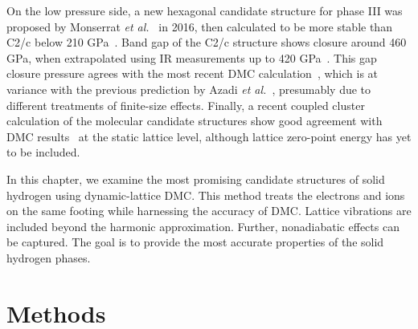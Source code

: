 On the low pressure side, a new hexagonal candidate structure for phase III was proposed by Monserrat \textit{et al.}~\cite{Monserrat2016} in 2016, then calculated to be more stable than C2/c below 210 GPa~\cite{Azadi2019}.
Band gap of the C2/c structure shows closure around 460 GPa, when extrapolated using IR measurements up to 420 GPa~\cite{Loubeyre2020}. This gap closure pressure agrees with the most recent DMC calculation~\cite{Gorelov2019}, which is at variance with the previous prediction by Azadi \textit{et al.}~\cite{Azadi2019}, presumably due to different treatments of finite-size effects.
Finally, a recent coupled cluster calculation of the molecular candidate structures show good agreement with DMC results~\cite{Liao2019} at the static lattice level, although lattice zero-point energy has yet to be included.

In this chapter, we examine the most promising candidate structures of solid hydrogen using dynamic-lattice DMC.
This method treats the electrons and ions on the same footing while harnessing the accuracy of DMC.
Lattice vibrations are included beyond the harmonic approximation. Further, nonadiabatic effects can be captured.
The goal is to provide the most accurate properties of the solid hydrogen phases.

\section{Methods}
\label{sec:hsolid-methods}

